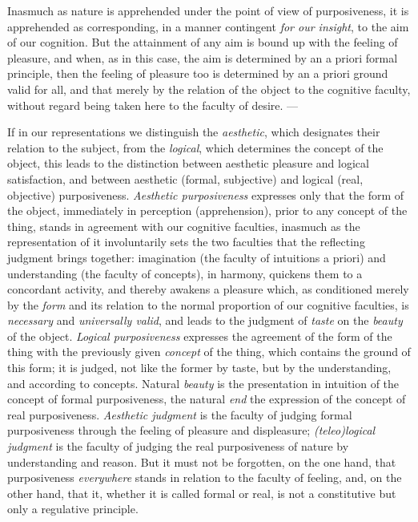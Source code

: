 Inasmuch as nature is apprehended under the point of view of
purposiveness, it is apprehended as corresponding, in a manner
contingent \emph{for our insight}, to the aim of our cognition. But the
attainment of any aim is bound up with the feeling of pleasure, and
when, as in this case, the aim is determined by an a priori formal
principle, then the feeling of pleasure too is determined by an a
priori ground valid for all, and that merely by the relation of the
object to the cognitive faculty, without regard being taken here to the
faculty of desire. ---

If in our representations we distinguish the \emph{aesthetic}, which
designates their relation to the subject, from the \emph{logical},
which determines the concept of the object, this leads to the
distinction between aesthetic pleasure and logical satisfaction, and
between aesthetic (formal, subjective) and logical (real, objective)
purposiveness. \emph{Aesthetic purposiveness}
expresses only that the form of the object, immediately in
perception (apprehension), prior to any concept of the thing, stands in
agreement with our cognitive faculties, inasmuch as the representation
of it involuntarily sets the two faculties that the reflecting judgment
brings together: imagination (the faculty of intuitions a priori) and
understanding (the faculty of concepts), in harmony, quickens them to a
concordant activity, and thereby awakens a pleasure which, as
conditioned merely by the \emph{form} and its relation to the normal
proportion of our cognitive faculties, is \emph{necessary} and
\emph{universally valid}, and leads to the judgment of \emph{taste} on
the \emph{beauty} of the object. \emph{Logical purposiveness} expresses
the agreement of the form of the thing with the previously given
\emph{concept} of the thing, which contains the ground of this form; it
is judged, not like the former by taste, but by the understanding, and
according to concepts. Natural \emph{beauty} is the presentation in
intuition of the concept of formal purposiveness, the natural
\emph{end} the expression of the concept of real purposiveness.
\emph{Aesthetic judgment} is the faculty of judging formal purposiveness
through the feeling of pleasure and displeasure; \emph{(teleo)logical
judgment} is the faculty of judging the real purposiveness of nature by
understanding and reason. But it must not be forgotten, on the one
hand, that purposiveness \emph{everywhere} stands in relation to the
faculty of feeling, and, on the other hand, that it, whether it is
called formal or real, is not a constitutive but only a regulative
principle.

